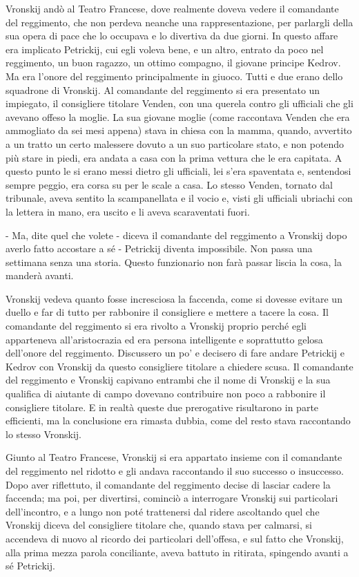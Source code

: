 Vronskij andò al Teatro Francese, dove realmente doveva vedere il comandante del reggimento, che non perdeva neanche una rappresentazione, per parlargli della sua opera di pace che lo occupava e lo divertiva da due giorni. In questo affare era implicato Petrickij, cui egli voleva bene, e un altro, entrato da poco nel reggimento, un buon ragazzo, un ottimo compagno, il giovane principe Kedrov. Ma era l'onore del reggimento principalmente in giuoco. Tutti e due erano dello squadrone di Vronskij. Al comandante del reggimento si era presentato un impiegato, il consigliere titolare Venden, con una querela contro gli ufficiali che gli avevano offeso la moglie. La sua giovane moglie (come raccontava Venden che era ammogliato da sei mesi appena) stava in chiesa con la mamma, quando, avvertito a un tratto un certo malessere dovuto a un suo particolare stato, e non potendo più stare in piedi, era andata a casa con la prima vettura che le era capitata. A questo punto le si erano messi dietro gli ufficiali, lei s'era spaventata e, sentendosi sempre peggio, era corsa su per le scale a casa. Lo stesso Venden, tornato dal tribunale, aveva sentito la scampanellata e il vocio e, visti gli ufficiali ubriachi con la lettera in mano, era uscito e li aveva scaraventati fuori. 

- Ma, dite quel che volete - diceva il comandante del reggimento a Vronskij dopo averlo fatto accostare a sé - Petrickij diventa impossibile. Non passa una settimana senza una storia. Questo funzionario non farà passar liscia la cosa, la manderà avanti. 

Vronskij vedeva quanto fosse incresciosa la faccenda, come si dovesse evitare un duello e far di tutto per rabbonire il consigliere e mettere a tacere la cosa. Il comandante del reggimento si era rivolto a Vronskij proprio perché egli apparteneva all'aristocrazia ed era persona intelligente e soprattutto gelosa dell'onore del reggimento. Discussero un po' e decisero di fare andare Petrickij e Kedrov con Vronskij da questo consigliere titolare a chiedere scusa. Il comandante del reggimento e Vronskij capivano entrambi che il nome di Vronskij e la sua qualifica di aiutante di campo dovevano contribuire non poco a rabbonire il consigliere titolare. E in realtà queste due prerogative risultarono in parte efficienti, ma la conclusione era rimasta dubbia, come del resto stava raccontando lo stesso Vronskij. 

Giunto al Teatro Francese, Vronskij si era appartato insieme con il comandante del reggimento nel ridotto e gli andava raccontando il suo successo o insuccesso. Dopo aver riflettuto, il comandante del reggimento decise di lasciar cadere la faccenda; ma poi, per divertirsi, cominciò a interrogare Vronskij sui particolari dell'incontro, e a lungo non poté trattenersi dal ridere ascoltando quel che Vronskij diceva del consigliere titolare che, quando stava per calmarsi, si accendeva di nuovo al ricordo dei particolari dell'offesa, e sul fatto che Vronskij, alla prima mezza parola conciliante, aveva battuto in ritirata, spingendo avanti a sé Petrickij. 

